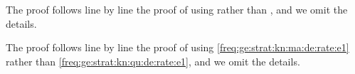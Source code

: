\begin{pro}
The proof follows line by line the proof of  using
 rather than , and we omit the details.\proEnd  
\end{pro}
\begin{pro}
The proof follows line by line the proof of   using
\eqref{freq:ge:strat:kn:ma:de:rate:e1} rather than \eqref{freq:ge:strat:kn:qu:de:rate:e1}, and we omit the details.\proEnd
\end{pro}

